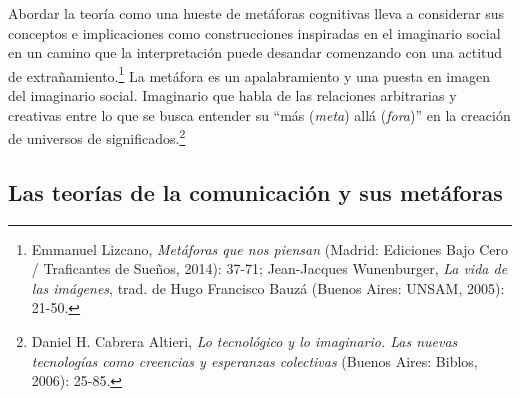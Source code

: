 \documentclass{tufte-handout}
\begin{document}
Abordar la teoría como una hueste de metáforas cognitivas lleva a
considerar sus conceptos e implicaciones como construcciones inspiradas
en el imaginario social en un camino que la interpretación puede
desandar comenzando con una actitud de extrañamiento.\footnote{Emmanuel
  Lizcano, \emph{Metáforas que nos piensan} (Madrid: Ediciones Bajo Cero
  / Traficantes de Sueños, 2014): 37-71; Jean-Jacques Wunenburger,
  \emph{La vida de las imágenes}, trad. de Hugo Francisco Bauzá (Buenos
  Aires: UNSAM, 2005): 21-50.} La metáfora es un apalabramiento y una
puesta en imagen del imaginario social. Imaginario que habla de las
relaciones arbitrarias y creativas entre lo que se busca entender su
``más (\emph{meta}) allá (\emph{fora})'' en la creación de universos de
significados.\footnote{Daniel H. Cabrera Altieri, \emph{Lo tecnológico y
  lo imaginario. Las nuevas tecnologías como creencias y esperanzas
  colectivas} (Buenos Aires: Biblos, 2006): 25-85.}

\hypertarget{las-teoras-de-la-comunicacin-y-sus-metforas}{%
\subsection{Las teorías de la comunicación y
sus
metáforas}\label{las-teoras-de-la-comunicacin-y-sus-metforas}}
\end{document}
